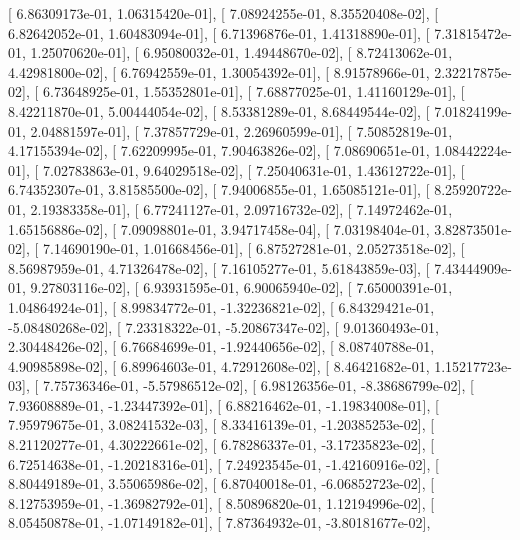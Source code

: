 \documentclass{article}
\begin{document}
       [  6.86309173e-01,   1.06315420e-01],
       [  7.08924255e-01,   8.35520408e-02],
       [  6.82642052e-01,   1.60483094e-01],
       [  6.71396876e-01,   1.41318890e-01],
       [  7.31815472e-01,   1.25070620e-01],
       [  6.95080032e-01,   1.49448670e-02],
       [  8.72413062e-01,   4.42981800e-02],
       [  6.76942559e-01,   1.30054392e-01],
       [  8.91578966e-01,   2.32217875e-02],
       [  6.73648925e-01,   1.55352801e-01],
       [  7.68877025e-01,   1.41160129e-01],
       [  8.42211870e-01,   5.00444054e-02],
       [  8.53381289e-01,   8.68449544e-02],
       [  7.01824199e-01,   2.04881597e-01],
       [  7.37857729e-01,   2.26960599e-01],
       [  7.50852819e-01,   4.17155394e-02],
       [  7.62209995e-01,   7.90463826e-02],
       [  7.08690651e-01,   1.08442224e-01],
       [  7.02783863e-01,   9.64029518e-02],
       [  7.25040631e-01,   1.43612722e-01],
       [  6.74352307e-01,   3.81585500e-02],
       [  7.94006855e-01,   1.65085121e-01],
       [  8.25920722e-01,   2.19383358e-01],
       [  6.77241127e-01,   2.09716732e-02],
       [  7.14972462e-01,   1.65156886e-02],
       [  7.09098801e-01,   3.94717458e-04],
       [  7.03198404e-01,   3.82873501e-02],
       [  7.14690190e-01,   1.01668456e-01],
       [  6.87527281e-01,   2.05273518e-02],
       [  8.56987959e-01,   4.71326478e-02],
       [  7.16105277e-01,   5.61843859e-03],
       [  7.43444909e-01,   9.27803116e-02],
       [  6.93931595e-01,   6.90065940e-02],
       [  7.65000391e-01,   1.04864924e-01],
       [  8.99834772e-01,  -1.32236821e-02],
       [  6.84329421e-01,  -5.08480268e-02],
       [  7.23318322e-01,  -5.20867347e-02],
       [  9.01360493e-01,   2.30448426e-02],
       [  6.76684699e-01,  -1.92440656e-02],
       [  8.08740788e-01,   4.90985898e-02],
       [  6.89964603e-01,   4.72912608e-02],
       [  8.46421682e-01,   1.15217723e-03],
       [  7.75736346e-01,  -5.57986512e-02],
       [  6.98126356e-01,  -8.38686799e-02],
       [  7.93608889e-01,  -1.23447392e-01],
       [  6.88216462e-01,  -1.19834008e-01],
       [  7.95979675e-01,   3.08241532e-03],
       [  8.33416139e-01,  -1.20385253e-02],
       [  8.21120277e-01,   4.30222661e-02],
       [  6.78286337e-01,  -3.17235823e-02],
       [  6.72514638e-01,  -1.20218316e-01],
       [  7.24923545e-01,  -1.42160916e-02],
       [  8.80449189e-01,   3.55065986e-02],
       [  6.87040018e-01,  -6.06852723e-02],
       [  8.12753959e-01,  -1.36982792e-01],
       [  8.50896820e-01,   1.12194996e-02],
       [  8.05450878e-01,  -1.07149182e-01],
       [  7.87364932e-01,  -3.80181677e-02],
\end{document}
